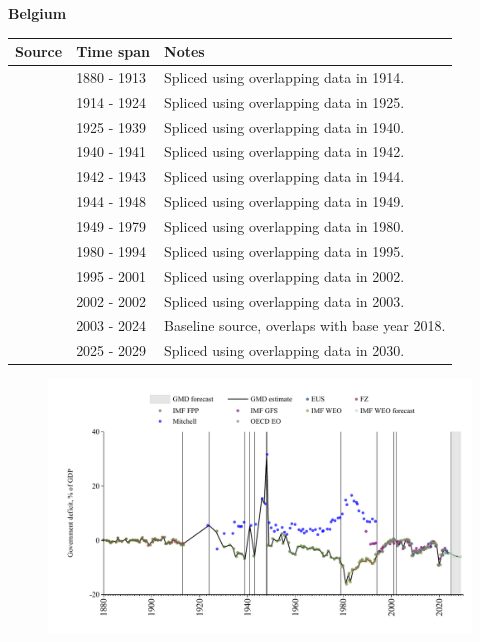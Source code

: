 \documentclass[12pt,a4paper,landscape]{article}
\begin{document}
\begin{adjustbox}{max totalsize={\paperwidth}{\paperheight},center}
\begin{minipage}[t][\textheight][t]{\textwidth}
\vspace*{0.5cm}
{}
\begin{center}
{\Large\bfseries Belgium}
\end{center}
\vspace{0.5cm}
\begin{table}[H]
\centering
\small
\begin{tabular}{|l|l|l|}
\hline
\textbf{Source} & \textbf{Time span} & \textbf{Notes} \\
\hline
\rowcolor{white}\cite{IMF_FPP}& 1880 - 1913 &Spliced using overlapping data in 1914.\\
\rowcolor{lightgray}\cite{Mitchell}& 1914 - 1924 &Spliced using overlapping data in 1925.\\
\rowcolor{white}\cite{IMF_FPP}& 1925 - 1939 &Spliced using overlapping data in 1940.\\
\rowcolor{lightgray}\cite{Mitchell}& 1940 - 1941 &Spliced using overlapping data in 1942.\\
\rowcolor{white}\cite{IMF_FPP}& 1942 - 1943 &Spliced using overlapping data in 1944.\\
\rowcolor{lightgray}\cite{Mitchell}& 1944 - 1948 &Spliced using overlapping data in 1949.\\
\rowcolor{white}\cite{IMF_FPP}& 1949 - 1979 &Spliced using overlapping data in 1980.\\
\rowcolor{lightgray}\cite{IMF_WEO}& 1980 - 1994 &Spliced using overlapping data in 1995.\\
\rowcolor{white}\cite{EUS}& 1995 - 2001 &Spliced using overlapping data in 2002.\\
\rowcolor{lightgray}\cite{OECD_EO}& 2002 - 2002 &Spliced using overlapping data in 2003.\\
\rowcolor{white}\cite{EUS}& 2003 - 2024 &Baseline source, overlaps with base year 2018.\\
\rowcolor{lightgray}\cite{IMF_WEO_forecast}& 2025 - 2029 &Spliced using overlapping data in 2030.\\
\hline
\end{tabular}
\end{table}
\begin{figure}[H]
\centering
\includegraphics[width=\textwidth,height=0.6\textheight,keepaspectratio]{graphs/BEL_govdef_GDP.pdf}

\end{figure}
\end{minipage}
\end{adjustbox}
\end{document}
